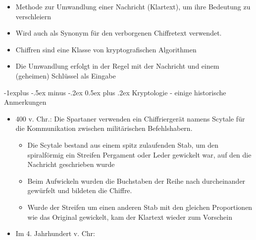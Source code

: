 \documentclass[a4paper]{article}
\makeatletter
\renewcommand{\subsection}{\@startsection{subsection}{2}{0mm}%
 {-1explus -.5ex minus -.2ex}%
 {0.5ex plus .2ex}%
 {\normalfont\normalsize\bfseries}}
\makeatother
\begin{document}
\begin{multicols}{3}
\begin{itemize}
              \begin{itemize}
                  \item
                        Methode zur Umwandlung einer Nachricht (Klartext), um ihre Bedeutung
                        zu verschleiern
                  \item
                        Wird auch als Synonym für den verborgenen Chiffretext verwendet.
                  \item
                        Chiffren sind eine Klasse von kryptografischen Algorithmen
                  \item
                        Die Umwandlung erfolgt in der Regel mit der Nachricht und einem
                        (geheimen) Schlüssel als Eingabe
              \end{itemize}
    \end{itemize}


    \subsection{Kryptologie - einige historische
        Anmerkungen}

    \begin{itemize}
        \item
              400 v. Chr.: Die Spartaner verwenden ein Chiffriergerät namens Scytale
              für die Kommunikation zwischen militärischen Befehlshabern.

              \begin{itemize}
                  \item
                        Die Scytale bestand aus einem spitz zulaufenden Stab, um den
                        spiralförmig ein Streifen Pergament oder Leder gewickelt war, auf
                        den die Nachricht geschrieben wurde
                  \item
                        Beim Aufwickeln wurden die Buchstaben der Reihe nach durcheinander
                        gewürfelt und bildeten die Chiffre.
                  \item
                        Wurde der Streifen um einen anderen Stab mit den gleichen
                        Proportionen wie das Original gewickelt, kam der Klartext wieder zum
                        Vorschein
              \end{itemize}
        \item
              Im 4. Jahrhundert v. Chr:


\end{itemize}
\end{multicols}
\end{document}
